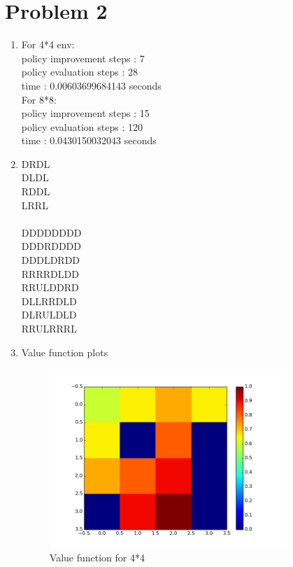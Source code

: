 \documentclass{article}
\begin{document}
\section{Problem 2}
\begin{enumerate}[label=(\alph*)]
\item 
For 4*4 env:\\
policy improvement steps : 7 \\
policy evaluation steps : 28 \\ 
time : 0.00603699684143 seconds\\

For 8*8:\\
policy improvement steps : 15\\
policy evaluation steps : 120 \\
time : 0.0430150032043 seconds
\item
DRDL\\
DLDL\\
RDDL\\
LRRL\\\\

DDDDDDDD\\
DDDRDDDD\\
DDDLDRDD\\
RRRRDLDD\\
RRULDDRD\\
DLLRRDLD\\
DLRULDLD\\
RRULRRRL\\

\item
Value function plots \\
\begin{figure}[H]
\centering
\includegraphics[width=90mm]{4_4.png}
\caption{Value function for 4*4 \label{overflow}}
\end{figure}


\end{enumerate}
\end{document}
